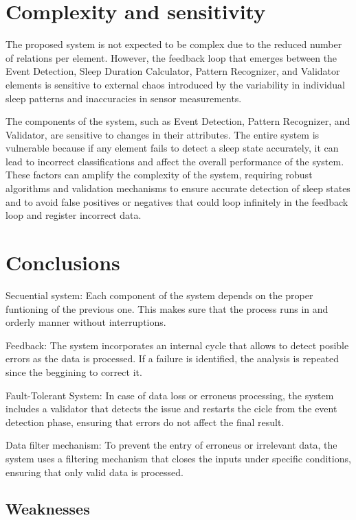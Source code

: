 \documentclass[conference]{IEEEtran}
\begin{document}
\section{Complexity and sensitivity}
The proposed system is not expected to be complex due to the reduced number of relations per element. However, the feedback 
loop that emerges between the Event Detection, Sleep Duration Calculator, Pattern Recognizer, and Validator elements is sensitive to 
external chaos introduced by the variability in individual sleep patterns and inaccuracies in sensor measurements. 

The components of the system, such as Event Detection, Pattern Recognizer, and Validator, are sensitive to changes in their attributes. The entire system is vulnerable because if any element
fails to detect a sleep state accurately, it can lead to incorrect classifications and affect the overall performance of the system.
These factors can amplify the complexity of the system, requiring robust algorithms and validation mechanisms to ensure accurate
detection of sleep states and to avoid false positives or negatives that could loop infinitely in the feedback loop and register incorrect
data.

\section{Conclusions}

Secuential system:
Each component of the system depends on the proper funtioning of the previous one. This makes sure that the process runs in and orderly manner without interruptions.

Feedback:
The system incorporates an internal cycle that allows to detect posible errors as the data is processed. If a failure is identified, the analysis is repeated since the beggining to correct it.

Fault-Tolerant System:
In case of data loss or erroneus processing, the system includes a validator that detects the issue and restarts the cicle from the event detection phase, ensuring that errors do not affect the final result.

Data filter mechanism:
To prevent the entry of erroneus or irrelevant data, the system uses a filtering mechanism that closes the inputs under specific conditions, ensuring that only valid data is processed.

\subsection{Weaknesses}
\end{document}
